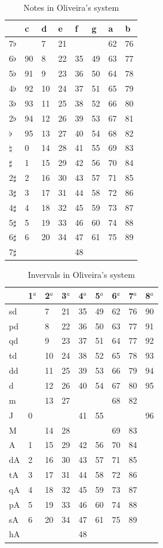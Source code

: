\documentclass{article}
\begin{document}
\begin{table}
  \centering
  \begin{tabular}{l|lllllll}
               & c & d& e& f& g& a& b \\
    \hline
    7$\flat$   &   & 7&21&  &  &62&76 \\
    6$\flat$   & 90& 8&22&35&49&63&77 \\
    5$\flat$   & 91& 9&23&36&50&64&78 \\
    4$\flat$   & 92&10&24&37&51&65&79 \\
    3$\flat$   & 93&11&25&38&52&66&80 \\
    2$\flat$   & 94&12&26&39&53&67&81 \\
    $\flat$    & 95&13&27&40&54&68&82 \\
    $\natural$ &  0&14&28&41&55&69&83 \\
    $\sharp$   &  1&15&29&42&56&70&84 \\
    2$\sharp$  &  2&16&30&43&57&71&85 \\
    3$\sharp$  &  3&17&31&44&58&72&86 \\
    4$\sharp$  &  4&18&32&45&59&73&87 \\
    5$\sharp$  &  5&19&33&46&60&74&88 \\
    6$\sharp$  &  6&20&34&47&61&75&89 \\
    7$\sharp$  &   &  &  &48&  &  &   \\
  \end{tabular}
  \caption{Notes in Oliveira's system}
  \label{tab:jama-notas}
\end{table}

\begin{table}
  \centering
  \begin{tabular}{l|llllllll}
    & 1$^{a}$& 2$^{a}$& 3$^{a}$& 4$^{a}$& 5$^{a}$& 6$^{a}$& 7$^{a}$& 8$^{a}$ \\
    \hline
    sd  &  & 7&21&35&49&62&76&90 \\
    pd  &  & 8&22&36&50&63&77&91 \\
    qd  &  & 9&23&37&51&64&77&92 \\
    td  &  &10&24&38&52&65&78&93 \\
    dd  &  &11&25&39&53&66&79&94 \\
    d   &  &12&26&40&54&67&80&95 \\
    m   &  &13&27&  &  &68&82&   \\
    J   & 0&  &  &41&55&  &  &96 \\
    M   &  &14&28&  &  &69&83&   \\
    A   & 1&15&29&42&56&70&84&   \\
    dA  & 2&16&30&43&57&71&85&   \\
    tA  & 3&17&31&44&58&72&86&   \\
    qA  & 4&18&32&45&59&73&87&   \\
    pA  & 5&19&33&46&60&74&88&   \\
    sA  & 6&20&34&47&61&75&89&   \\
    hA  &  &  &  &48&  &  &  &   
  \end{tabular}
  \caption{Invervals in Oliveira's system}
  \label{tab:jama-intervalos}
\end{table}
\end{document}
